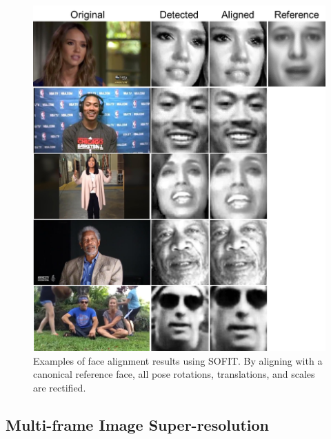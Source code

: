 \documentclass[review]{elsarticle}
\begin{document}
\begin{figure}[htbp]
	\centering
	\includegraphics[width=.8\columnwidth]{fig/suppliment.png}
	\caption{Examples of face alignment results using SOFIT. By aligning with a canonical reference face, all pose rotations, translations, and scales are rectified. }
	\label{fig:suppliment}
\end{figure}



\subsection{Multi-frame Image Super-resolution}
\end{document}
